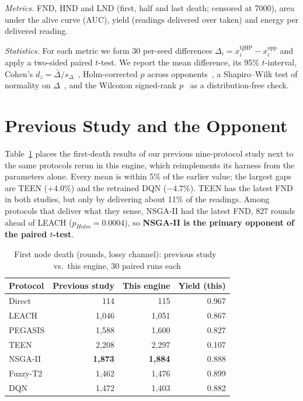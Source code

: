 \emph{Metrics.} FND, HND and LND (first, half and last death; censored at 7000), area under the alive curve (AUC), yield (readings delivered over taken) and energy per delivered reading.

\emph{Statistics.} For each metric we form 30 per-seed differences $\Delta_i=x_i^{\text{QHP}}-x_i^{\text{opp}}$ and apply a two-sided paired $t$-test. We report the mean difference, its 95\% $t$-interval, Cohen's $d_z=\bar\Delta/s_\Delta$~\cite{cohen1988power}, Holm-corrected $p$ across opponents~\cite{holm1979simple}, a Shapiro--Wilk test of normality on $\Delta$~\cite{shapiro1965analysis}, and the Wilcoxon signed-rank $p$~\cite{wilcoxon1945individual} as a distribution-free check.

\section{Previous Study and the Opponent}
Table~\ref{tab:prev} places the first-death results of our previous nine-protocol study next to the same protocols rerun in this engine, which reimplements its harness from the parameters alone. Every mean is within 5\% of the earlier value; the largest gaps are TEEN ($+4.0\%$) and the retrained DQN ($-4.7\%$). TEEN has the latest FND in both studies, but only by delivering about 11\% of the readings. Among protocols that deliver what they sense, NSGA-II had the latest FND, 827 rounds ahead of LEACH ($p_{Holm}{=}0.0004$), so \textbf{NSGA-II is the primary opponent of the paired $t$-test}.

\begin{table}[t]
\caption{First node death (rounds, lossy channel): previous study~\cite{sharma2026unified} vs.\ this engine, 30 paired runs each}
\label{tab:prev}
\centering\footnotesize
\begin{tabular}{@{}lrrr@{}}
\toprule
Protocol & Previous study & This engine & Yield (this)\\
\midrule
Direct & 114 & 115 & 0.967\\
LEACH & 1,046 & 1,051 & 0.867\\
PEGASIS & 1,588 & 1,600 & 0.827\\
TEEN & 2,208 & 2,297 & 0.107\\
NSGA-II & \textbf{1,873} & \textbf{1,884} & 0.888\\
Fuzzy-T2 & 1,462 & 1,476 & 0.899\\
DQN & 1,472 & 1,403 & 0.882\\
\bottomrule
\end{tabular}
\end{table}

